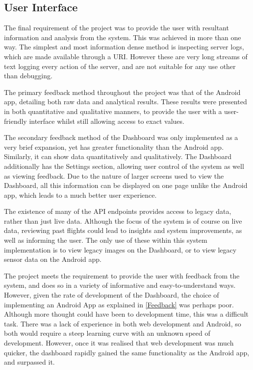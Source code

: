 \documentclass{article}
\begin{document}
\subsection{User Interface}
The final requirement of the project was to provide the user with resultant information and analysis from the system. This was achieved in more than one way. The simplest and most information dense method is inspecting server logs, which are made available through a URI. However these are very long streams of text logging every action of the server, and are not suitable for any use other than debugging. 

The primary feedback method throughout the project was that of the Android app, detailing both raw data and analytical results. These results were presented in both quantitative and qualitative manners, to provide the user with a user-friendly interface whilst still allowing access to exact values.

The secondary feedback method of the Dashboard was only implemented as a very brief expansion, yet has greater functionality than the Android app. Similarly, it can show data quantitatively and qualitatively. The Dashboard additionally has the Settings section, allowing user control of the system as well as viewing feedback. Due to the nature of larger screens used to view the Dashboard, all this information can be displayed on one page unlike the Android app, which leads to a much better user experience. 

The existence of many of the API endpoints provides access to legacy data, rather than just live data. Although the focus of the system is of course on live data, reviewing past flights could lead to insights and system improvements, as well as informing the user. The only use of these within this system implementation is to view legacy images on the Dashboard, or to view legacy sensor data on the Android app.  

The project meets the requirement to provide the user with feedback from the system, and does so in a variety of informative and easy-to-understand ways. However, given the rate of development of the Dashboard, the choice of implementing an Android App as explained in \ref{Feedback} was perhaps poor. Although more thought could have been to development time, this was a difficult task. There was a lack of experience in both web development and Android, so both would require a steep learning curve with an unknown speed of development. However, once it was realised that web development was much quicker, the dashboard rapidly gained the same functionality as the Android app, and surpassed it. 
\end{document}
